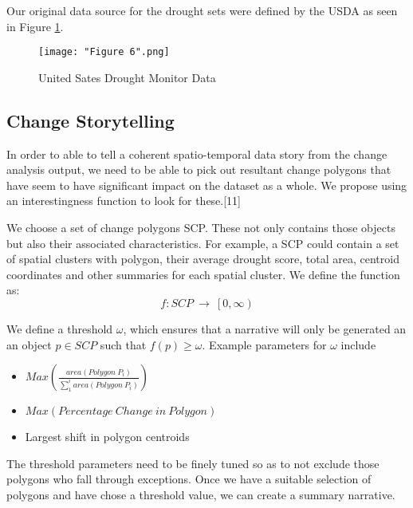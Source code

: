 \documentclass[conference]{IEEEtran}
\begin{document}
%

Our original data source for the drought sets were defined by the USDA as seen in Figure \ref{Figure 6}.

\begin{figure}[ht]
\centerline{\texttt{[image: "Figure 6".png]}}
\caption{United Sates Drought Monitor Data}
\label{Figure 6}
\end{figure}

\subsection{Change Storytelling}

In order to able to tell a coherent spatio-temporal data story from the change analysis output, we need to be able to pick out resultant change polygons that have seem to have significant impact on the dataset as a whole. We propose using an interestingness function to look for these.[11]

We choose a set of change polygons SCP. These not only contains those objects but also their associated characteristics. For example, a SCP could contain a set of spatial clusters with polygon, their average drought score, total area, centroid coordinates and other summaries for each spatial cluster. We define the function as:
\[f:SCP\ \rightarrow\ \left[0\right.,\left.\infty\right)\]

We define a threshold $\omega$, which ensures that a narrative will only be generated an an object $p \in SCP$ such that $f(p) \ge \omega$. Example parameters for $\omega$ include  

\begin{itemize}
\item $Max\left(\frac{area\left(Polygon\ P_i\right)}{\sum_{1}^{i}area\left(Polygon\ P_i\right)}\right)$
\item $Max\left(Percentage\ Change\ in\ Polygon\right)$
\item Largest shift in polygon centroids
\end{itemize}

The threshold parameters need to be finely tuned so as to not exclude those polygons who fall through exceptions. Once we have a suitable selection of polygons and have chose a threshold value, we can create a summary narrative. 
\end{document}
